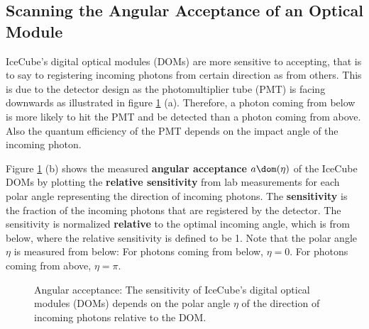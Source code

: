 
\subsection{Scanning the Angular Acceptance of an Optical Module}
\label{sec:angular_acceptance_scan}

IceCube's digital optical modules (DOMs) are more sensitive to accepting, that is to say to registering incoming photons from certain direction as from others. This is due to the detector design as the photomultiplier tube (PMT) is facing downwards as illustrated in figure \ref{fig:weihee6X} (a). Therefore, a photon coming from below is more likely to hit the PMT and be detected than a photon coming from above. Also the quantum efficiency of the PMT depends on the impact angle of the incoming photon.

Figure \ref{fig:weihee6X} (b) shows the measured \textbf{angular acceptance} $a\dom(\eta)$ of the IceCube DOMs by plotting the \textbf{relative sensitivity} from lab measurements for each polar angle representing the direction of incoming photons. \cite{icepaper} The \textbf{sensitivity} is the fraction of the incoming photons that are registered by the detector. The sensitivity is normalized \textbf{relative} to the optimal incoming angle, which is from below, where the relative sensitivity is defined to be 1. Note that the polar angle $\eta$ is measured from below: For photons coming from below, $\eta = 0$. For photons coming from above, $\eta = \pi$.


\begin{figure}[htbp]
  \hfill
  \caption{Angular acceptance: The sensitivity of IceCube's digital optical modules (DOMs) depends on the polar angle $\eta$ of the direction of incoming photons relative to the DOM.}
  \label{fig:weihee6X}
\end{figure}


